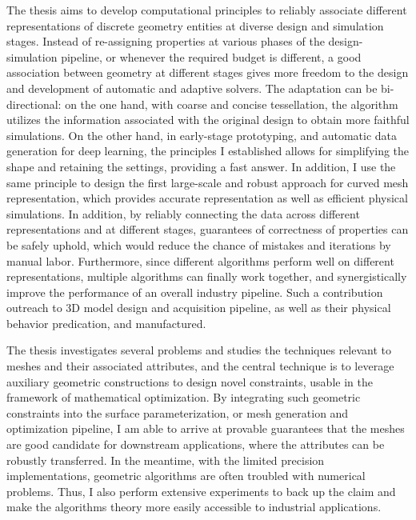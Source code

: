 The thesis aims to develop computational principles to reliably associate different representations of discrete geometry entities at diverse design and simulation stages. Instead of re-assigning properties at various phases of the design-simulation pipeline, or whenever the required budget is different, a good association between geometry at different stages gives more freedom to the design and development of automatic and adaptive solvers. The adaptation can be bi-directional: on the one hand, with coarse and concise tessellation, the algorithm utilizes the information associated with the original design to obtain more faithful simulations. On the other hand, in early-stage prototyping, and automatic data generation for deep learning, the principles I established allows for simplifying the shape and retaining the settings, providing a fast answer. In addition, I use the same principle to design the first large-scale and robust approach for curved mesh representation, which provides accurate representation as well as efficient physical simulations.
In addition, by reliably connecting the data across different representations and at different stages, guarantees of correctness of properties can be safely uphold, which would reduce the chance of mistakes and iterations by manual labor. 
Furthermore,  since different algorithms perform well on different representations, multiple algorithms can finally work together, and synergistically improve the performance of an overall industry pipeline.
Such a contribution outreach to 3D model design and acquisition pipeline, as well as their physical behavior predication, and manufactured.

The thesis investigates several problems and studies the techniques relevant to meshes and their associated attributes, and the central technique is to leverage auxiliary geometric constructions to design novel constraints, usable in the framework of mathematical optimization. 
By integrating such geometric constraints into the surface parameterization, or mesh generation and optimization pipeline, I am able to arrive at provable guarantees that the meshes are good candidate for downstream applications, where the attributes can be robustly transferred.
In the meantime, with the limited precision implementations, geometric algorithms are often troubled with numerical problems. Thus, I also perform extensive experiments to back up the claim and make the algorithms theory more easily accessible to industrial applications.

